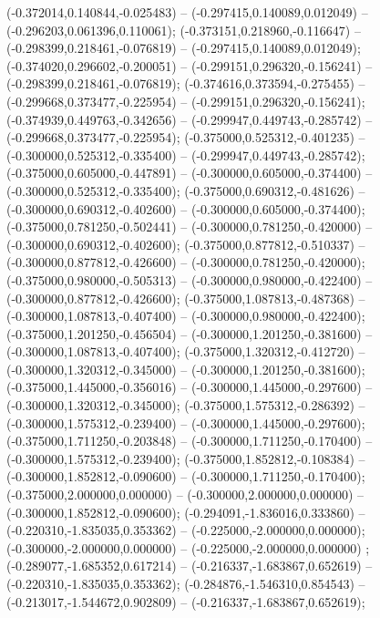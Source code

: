  (-0.372014,0.140844,-0.025483) -- (-0.297415,0.140089,0.012049) -- (-0.296203,0.061396,0.110061);
 (-0.373151,0.218960,-0.116647) -- (-0.298399,0.218461,-0.076819) -- (-0.297415,0.140089,0.012049);
 (-0.374020,0.296602,-0.200051) -- (-0.299151,0.296320,-0.156241) -- (-0.298399,0.218461,-0.076819);
 (-0.374616,0.373594,-0.275455) -- (-0.299668,0.373477,-0.225954) -- (-0.299151,0.296320,-0.156241);
 (-0.374939,0.449763,-0.342656) -- (-0.299947,0.449743,-0.285742) -- (-0.299668,0.373477,-0.225954);
 (-0.375000,0.525312,-0.401235) -- (-0.300000,0.525312,-0.335400) -- (-0.299947,0.449743,-0.285742);
 (-0.375000,0.605000,-0.447891) -- (-0.300000,0.605000,-0.374400) -- (-0.300000,0.525312,-0.335400);
 (-0.375000,0.690312,-0.481626) -- (-0.300000,0.690312,-0.402600) -- (-0.300000,0.605000,-0.374400);
 (-0.375000,0.781250,-0.502441) -- (-0.300000,0.781250,-0.420000) -- (-0.300000,0.690312,-0.402600);
 (-0.375000,0.877812,-0.510337) -- (-0.300000,0.877812,-0.426600) -- (-0.300000,0.781250,-0.420000);
 (-0.375000,0.980000,-0.505313) -- (-0.300000,0.980000,-0.422400) -- (-0.300000,0.877812,-0.426600);
 (-0.375000,1.087813,-0.487368) -- (-0.300000,1.087813,-0.407400) -- (-0.300000,0.980000,-0.422400);
 (-0.375000,1.201250,-0.456504) -- (-0.300000,1.201250,-0.381600) -- (-0.300000,1.087813,-0.407400);
 (-0.375000,1.320312,-0.412720) -- (-0.300000,1.320312,-0.345000) -- (-0.300000,1.201250,-0.381600);
 (-0.375000,1.445000,-0.356016) -- (-0.300000,1.445000,-0.297600) -- (-0.300000,1.320312,-0.345000);
 (-0.375000,1.575312,-0.286392) -- (-0.300000,1.575312,-0.239400) -- (-0.300000,1.445000,-0.297600);
 (-0.375000,1.711250,-0.203848) -- (-0.300000,1.711250,-0.170400) -- (-0.300000,1.575312,-0.239400);
 (-0.375000,1.852812,-0.108384) -- (-0.300000,1.852812,-0.090600) -- (-0.300000,1.711250,-0.170400);
 (-0.375000,2.000000,0.000000) -- (-0.300000,2.000000,0.000000) -- (-0.300000,1.852812,-0.090600);
 (-0.294091,-1.836016,0.333860) -- (-0.220310,-1.835035,0.353362) -- (-0.225000,-2.000000,0.000000);
 (-0.300000,-2.000000,0.000000) -- (-0.225000,-2.000000,0.000000) ;
 (-0.289077,-1.685352,0.617214) -- (-0.216337,-1.683867,0.652619) -- (-0.220310,-1.835035,0.353362);
 (-0.284876,-1.546310,0.854543) -- (-0.213017,-1.544672,0.902809) -- (-0.216337,-1.683867,0.652619);
